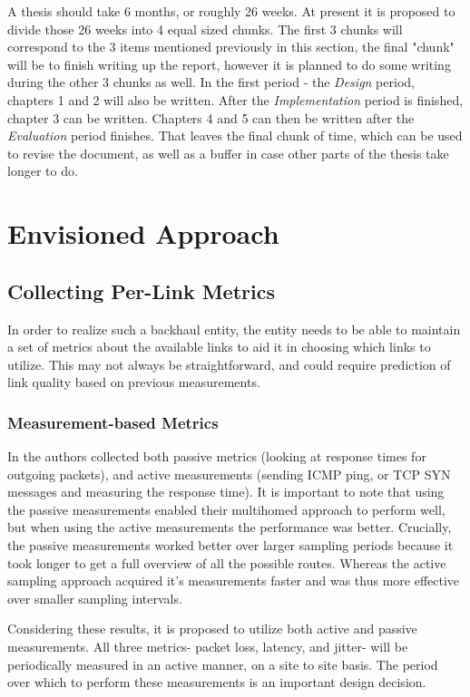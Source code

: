 A thesis should take 6 months, or roughly 26 weeks. At present it is proposed to divide those 26 weeks into 4 equal sized chunks. The first 3 chunks will correspond to the 3 items mentioned previously in this section, the final "chunk" will be to finish writing up the report, however it is planned to do some writing during the other 3 chunks as well. In the first period - the \textit{Design} period, chapters 1 and 2 will also be written. After the \textit{Implementation} period is finished, chapter 3 can be written. Chapters 4 and 5 can then be written after the \textit{Evaluation} period finishes. That leaves the final chunk of time, which can be used to revise the document, as well as a buffer in case other parts of the thesis take longer to do. 

\section{Envisioned Approach}

\subsection{Collecting Per-Link Metrics}

In order to realize such a backhaul entity, the entity needs to be able to maintain a set of metrics about the available links to aid it in choosing which links to utilize. This may not always be straightforward, and could require prediction of link quality based on previous measurements.

\subsubsection{Measurement-based Metrics}

In \cite{akella2008performance} the authors collected both passive metrics (looking at response times for outgoing packets), and active measurements (sending ICMP ping, or TCP SYN messages and measuring the response time). It is important to note that using the passive measurements enabled their multihomed approach to perform well, but when using the active measurements the performance was better. Crucially, the passive measurements worked better over larger sampling periods because it took longer to get a full overview of all the possible routes. Whereas the active sampling approach acquired it's measurements faster and was thus more effective over smaller sampling intervals.

Considering these results, it is proposed to utilize both active and passive measurements. All three metrics- packet loss, latency, and jitter- will be periodically measured in an active manner, on a site to site basis. The period over which to perform these measurements is an important design decision.

